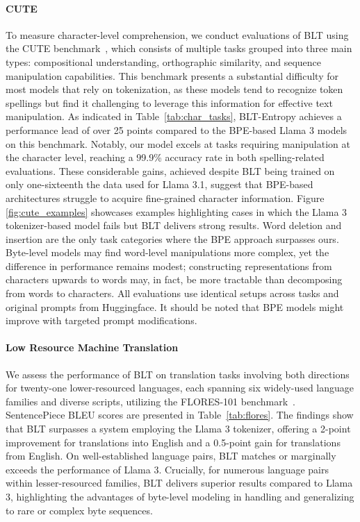 \paragraph{CUTE}
To measure character-level comprehension, we conduct evaluations of {\textsc BLT} using the CUTE benchmark~\citep{edman2024cute}, which consists of multiple tasks grouped into three main types: compositional understanding, orthographic similarity, and sequence manipulation capabilities. This benchmark presents a substantial difficulty for most models that rely on tokenization, as these models tend to recognize token spellings but find it challenging to leverage this information for effective text manipulation. As indicated in Table~\ref{tab:char_tasks}, {\textsc BLT}-Entropy achieves a performance lead of over 25 points compared to the BPE-based Llama 3 models on this benchmark. Notably, our model excels at tasks requiring manipulation at the character level, reaching a 99.9\% accuracy rate in both spelling-related evaluations. These considerable gains, achieved despite {\textsc BLT} being trained on only one-sixteenth the data used for Llama 3.1, suggest that BPE-based architectures struggle to acquire fine-grained character information. Figure \ref{fig:cute_examples} showcases examples highlighting cases in which the Llama 3 tokenizer-based model fails but {\textsc BLT} delivers strong results. Word deletion and insertion are the only task categories where the BPE approach surpasses ours. Byte-level models may find word-level manipulations more complex, yet the difference in performance remains modest; constructing representations from characters upwards to words may, in fact, be more tractable than decomposing from words to characters. All evaluations use identical setups across tasks and original prompts from Huggingface. It should be noted that BPE models might improve with targeted prompt modifications.

\paragraph{Low Resource Machine Translation} We assess the performance of {\textsc BLT} on translation tasks involving both directions for twenty-one lower-resourced languages, each spanning six widely-used language families and diverse scripts, utilizing the FLORES-101 benchmark~\citep{goyal2022flores}. SentencePiece BLEU scores are presented in Table~\ref{tab:flores}. The findings show that {\textsc BLT} surpasses a system employing the Llama 3 tokenizer, offering a 2-point improvement for translations into English and a 0.5-point gain for translations from English. On well-established language pairs, {\textsc BLT} matches or marginally exceeds the performance of Llama 3. Crucially, for numerous language pairs within lesser-resourced families, {\textsc BLT} delivers superior results compared to Llama 3, highlighting the advantages of byte-level modeling in handling and generalizing to rare or complex byte sequences.

